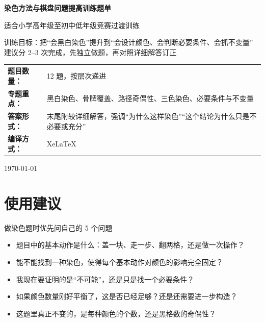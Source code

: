 \documentclass[11pt,a4paper,fontset=fandol]{ctexart}
\theoremstyle{formalexample}
\begin{document}
\thispagestyle{empty}
\begin{titlepage}
\centering
\vspace*{0.9cm}
\begin{tcolorbox}[
  enhanced,
  width=0.92\textwidth,
  colback=white,
  colframe=mainblue,
  boxrule=1pt,
  arc=0mm,
  left=6mm,
  right=6mm,
  top=8mm,
  bottom=8mm
]
\centering
{\fontsize{24}{30}\selectfont\bfseries 染色方法与棋盘问题提高训练题单\par}
\vspace{0.6cm}
{\fontsize{17}{22}\selectfont 适合小学高年级至初中低年级竞赛过渡训练\par}

\vspace{1cm}
\begin{tcolorbox}[colback=lightblue,colframe=mainblue,width=0.84\textwidth,boxrule=1pt]
\centering
{\large 训练目标：把“会黑白染色”提升到“会设计颜色、会判断必要条件、会抓不变量”}\\[0.35em]
{\normalsize 建议分 2--3 次完成，先独立做题，再对照详细解答订正}
\end{tcolorbox}

\vspace{1cm}
\renewcommand{\arraystretch}{1.42}
\begin{tabular}{>{\bfseries}p{3.5cm}p{8cm}}
题目数量： & 12 题，按层次递进 \\
专题重点： & 黑白染色、骨牌覆盖、路径奇偶性、三色染色、必要条件与不变量 \\
答案形式： & 末尾附较详细解答，强调“为什么这样染色”“这个结论为什么只是不必要或充分” \\
编译方式： & XeLaTeX \\
\end{tabular}

\vspace{0.9cm}
{\large \today\par}
\end{tcolorbox}
\end{titlepage}

\tableofcontents
\newpage

\section{使用建议}

\begin{goalbox}{做染色题时优先问自己的 5 个问题}
\begin{itemize}
  \item 题目中的基本动作是什么：盖一块、走一步、翻两格，还是做一次操作？
  \item 能不能找到一种染色，使得每个基本动作对颜色的影响完全固定？
  \item 我现在要证明的是“不可能”，还是只是找一个必要条件？
  \item 如果颜色数量刚好平衡了，这是否已经足够？还是还需要进一步构造？
  \item 这题里真正不变的，是每种颜色的个数，还是黑格数的奇偶性？
\end{itemize}
\end{goalbox}
\end{document}
